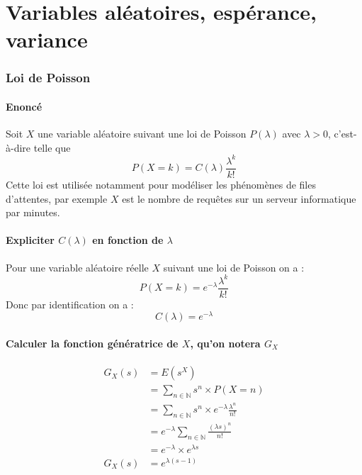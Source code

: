 \documentclass[10pt,a4paper,twoside]{article}
\begin{document}
\newpage
\part{Variables aléatoires, espérance, variance}
\setcounter{section}{0}
\section{Loi de Poisson}
\subsection*{Enoncé}
Soit $X$ une variable aléatoire suivant une loi de Poisson $P(\lambda)$ avec $\lambda > 0$, c'est-à-dire telle que
\[ P(X=k)=C(\lambda)\frac{\lambda^{k}}{k!}  \]
Cette loi est utilisée notamment pour modéliser les phénomènes de files d'attentes, par exemple $X$ est le nombre de requêtes sur un serveur informatique par minutes.

\subsection{Expliciter $C(\lambda)$ en fonction de $\lambda$}
Pour une variable aléatoire réelle $X$ suivant une loi de Poisson on a :
\[P(X=k) = e^{-\lambda}\frac{\lambda^{k}}{k!} \]
Donc par identification on a :
\[ C(\lambda) = e^{-\lambda} \]

\subsection{Calculer la fonction génératrice de $X$, qu'on notera $G_{X}$}
\begin{align*}
G_{X}(s) &= E(s^{X})\\
 &= \sum_{n\in\mathbb{N}}s^{n} \times P(X=n)\\
 &= \sum_{n\in\mathbb{N}}s^{n} \times e^{-\lambda} \frac{\lambda^{n}}{n!}\\
 &= e^{-\lambda}\sum_{n\in\mathbb{N}} \frac{(\lambda s)^{n}}{n!}\\
 &= e^{-\lambda}\times e^{\lambda s}\\
G_{X}(s) &= e^{\lambda(s-1)}\\
\end{align*}
\end{document}
